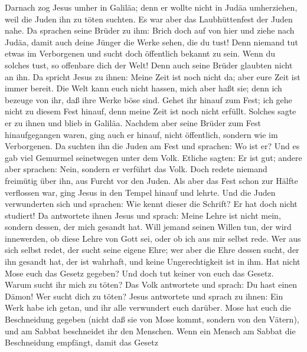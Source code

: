  Darnach zog Jesus umher in Galiläa; denn er wollte nicht
in Judäa umherziehen, weil die Juden ihn zu töten suchten.
 Es war aber das Laubhüttenfest der Juden nahe.
 Da sprachen seine Brüder zu ihm: Brich doch auf von hier
und ziehe nach Judäa, damit auch deine Jünger die Werke sehen, die du
tust!  Denn niemand tut etwas im Verborgenen und sucht
doch öffentlich bekannt zu sein. Wenn du solches tust, so offenbare dich
der Welt!  Denn auch seine Brüder glaubten nicht an ihn.
 Da spricht Jesus zu ihnen: Meine Zeit ist noch nicht da;
aber eure Zeit ist immer bereit.  Die Welt kann euch nicht
hassen, mich aber haßt sie; denn ich bezeuge von ihr, daß ihre Werke
böse sind.  Gehet ihr hinauf zum Fest; ich gehe nicht zu
diesem Fest hinauf, denn meine Zeit ist noch nicht erfüllt.
 Solches sagte er zu ihnen und blieb in Galiläa.
 Nachdem aber seine Brüder zum Fest hinaufgegangen waren,
ging auch er hinauf, nicht öffentlich, sondern wie im Verborgenen.
 Da suchten ihn die Juden am Fest und sprachen: Wo ist
er?  Und es gab viel Gemurmel seinetwegen unter dem Volk.
Etliche sagten: Er ist gut; andere aber sprachen: Nein, sondern er
verführt das Volk.  Doch redete niemand freimütig über
ihn, aus Furcht vor den Juden.  Als aber das Fest schon
zur Hälfte verflossen war, ging Jesus in den Tempel hinauf und lehrte.
 Und die Juden verwunderten sich und sprachen: Wie kennt
dieser die Schrift? Er hat doch nicht studiert!  Da
antwortete ihnen Jesus und sprach: Meine Lehre ist nicht mein, sondern
dessen, der mich gesandt hat.  Will jemand seinen Willen
tun, der wird innewerden, ob diese Lehre von Gott sei, oder ob ich aus
mir selbst rede.  Wer aus sich selbst redet, der sucht
seine eigene Ehre; wer aber die Ehre dessen sucht, der ihn gesandt hat,
der ist wahrhaft, und keine Ungerechtigkeit ist in ihm. 
Hat nicht Mose euch das Gesetz gegeben? Und doch tut keiner von euch das
Gesetz. Warum sucht ihr mich zu töten?  Das Volk
antwortete und sprach: Du hast einen Dämon! Wer sucht dich zu töten?
 Jesus antwortete und sprach zu ihnen: Ein Werk habe ich
getan, und ihr alle verwundert euch darüber.  Mose hat
euch die Beschneidung gegeben (nicht daß sie von Mose kommt, sondern von
den Vätern), und am Sabbat beschneidet ihr den Menschen. 
Wenn ein Mensch am Sabbat die Beschneidung empfängt, damit das Gesetz
